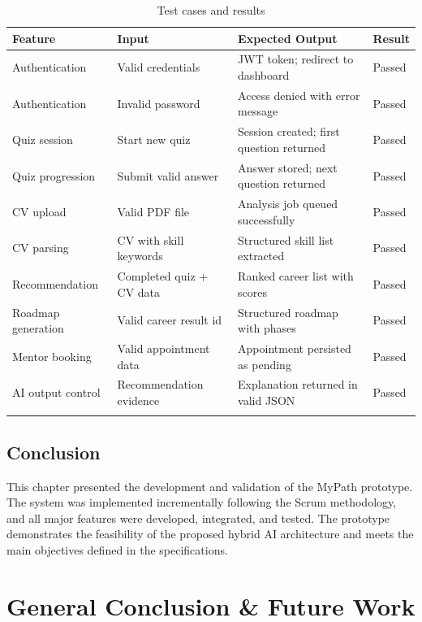 \documentclass[12pt,a4paper]{article}
\begin{document}
\begin{longtable}{|p{3cm}|p{3.8cm}|p{4.4cm}|p{2cm}|}
\hline
\textbf{Feature} & \textbf{Input} & \textbf{Expected Output} & \textbf{Result} \\
\hline
Authentication      & Valid credentials        & JWT token; redirect to dashboard         & Passed \\
Authentication      & Invalid password         & Access denied with error message         & Passed \\
Quiz session        & Start new quiz           & Session created; first question returned & Passed \\
Quiz progression    & Submit valid answer      & Answer stored; next question returned    & Passed \\
CV upload           & Valid PDF file           & Analysis job queued successfully         & Passed \\
CV parsing          & CV with skill keywords   & Structured skill list extracted          & Passed \\
Recommendation      & Completed quiz + CV data & Ranked career list with scores           & Passed \\
Roadmap generation  & Valid career result id   & Structured roadmap with phases           & Passed \\
Mentor booking      & Valid appointment data   & Appointment persisted as pending         & Passed \\
AI output control   & Recommendation evidence  & Explanation returned in valid JSON       & Passed \\
\hline
\caption{Test cases and results}
\end{longtable}

\subsection{Conclusion}

This chapter presented the development and validation of the MyPath prototype. The system was implemented incrementally following the Scrum methodology, and all major features were developed, integrated, and tested. The prototype demonstrates the feasibility of the proposed hybrid AI architecture and meets the main objectives defined in the specifications.

\clearpage

\section{General Conclusion \& Future Work}
\end{document}

